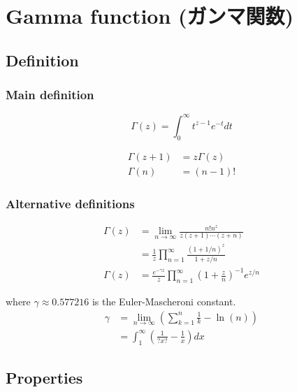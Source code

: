 %
%
%
%
%
\section{Gamma function (ガンマ関数)}


\subsection{Definition}

\subsubsection{Main definition}
\begin{equation}
  \Gamma \left( z \right) = \int^{\infty }_{0} t^{z-1} e^{-t} dt
\end{equation}

\begin{align}
  \Gamma \left( z + 1 \right)
      & = z \Gamma \left( z \right) \\
  \Gamma \left( n \right)
      & = \left( n - 1 \right) !
\end{align}



\subsubsection{Alternative definitions}
\begin{align}
  \Gamma \left( z \right)
      & = \lim_{ n \to \infty} \frac{ n! n^z } { z \left( z+1 \right) \cdots \left( z + n \right) } \\
      & = \frac{ 1 }{ z } \prod_{n=1}^{\infty } \frac{ {\left( 1 + 1/n \right)}^{z} }{ 1 + z/n } \\
  \Gamma \left( z \right)
      & = \frac{ e^{ -\gamma z } }{ z } \prod_{n=1}^{\infty } { \left( 1 + \frac{z}{n} \right) }^{-1} e^{z/n}
\end{align}

where $ \gamma \approx 0.577216 $ is the Euler-Mascheroni constant.
\begin{align}
  \gamma
    & = \lim_{ n \to \infty } \left( \sum_{k=1}^{n} \frac{1}{k} - \ln (n) \right) \\
    & = \int_{1}^{\infty } \left( \frac{1}{?x?} - \frac{1}{x} \right) dx
\end{align}


\subsection{Properties}
